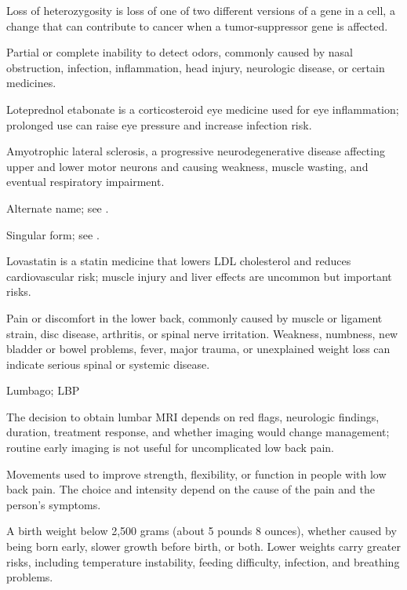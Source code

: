  Loss of heterozygosity is loss of one of two different versions of a gene in a cell, a change that can contribute to cancer when a tumor-suppressor gene is affected.

 Partial or complete inability to detect odors, commonly caused by nasal obstruction, infection, inflammation, head injury, neurologic disease, or certain medicines.

 Loteprednol etabonate is a corticosteroid eye medicine used for eye inflammation; prolonged use can raise eye pressure and increase infection risk.

 Amyotrophic lateral sclerosis, a progressive neurodegenerative disease affecting upper and lower motor neurons and causing weakness, muscle wasting, and eventual respiratory impairment.

 Alternate name; see .

 Singular form; see .

 Lovastatin is a statin medicine that lowers LDL cholesterol and reduces cardiovascular risk; muscle injury and liver effects are uncommon but important risks.

 Pain or discomfort in the lower back, commonly caused by muscle or ligament strain, disc disease, arthritis, or spinal
nerve irritation. Weakness, numbness, new bladder or bowel problems, fever, major trauma, or unexplained
weight loss can indicate serious spinal or systemic disease.

\synonyms
Lumbago; LBP

 The decision to obtain lumbar MRI depends on red flags, neurologic findings, duration, treatment response, and whether imaging would change management; routine early imaging is not useful for uncomplicated low back pain.

 Movements used to improve strength, flexibility, or function in people with low back pain. The choice and intensity depend on the cause of the pain and the person's symptoms.

 A birth weight below 2,500 grams (about 5 pounds 8 ounces), whether caused by being born early, slower growth before birth, or both. Lower weights carry greater risks, including temperature instability, feeding difficulty, infection, and breathing problems.

